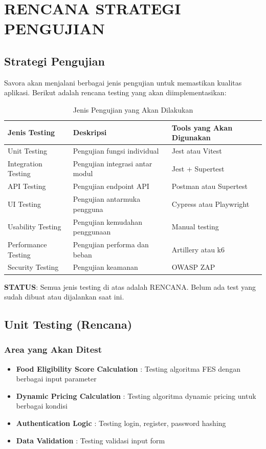 \section{RENCANA STRATEGI PENGUJIAN}

\subsection{Strategi Pengujian}

Savora akan menjalani berbagai jenis pengujian untuk memastikan kualitas aplikasi. Berikut adalah rencana testing yang akan diimplementasikan:

\begin{table}[H]
\centering
\caption{Jenis Pengujian yang Akan Dilakukan}
\label{tab:testing}
\begin{tabularx}{\textwidth}{|l|X|X|}
\hline
\textbf{Jenis Testing} & \textbf{Deskripsi} & \textbf{Tools yang Akan Digunakan} \\
\hline
Unit Testing & Pengujian fungsi individual & Jest atau Vitest \\
\hline
Integration Testing & Pengujian integrasi antar modul & Jest + Supertest \\
\hline
API Testing & Pengujian endpoint API & Postman atau Supertest \\
\hline
UI Testing & Pengujian antarmuka pengguna & Cypress atau Playwright \\
\hline
Usability Testing & Pengujian kemudahan penggunaan & Manual testing \\
\hline
Performance Testing & Pengujian performa dan beban & Artillery atau k6 \\
\hline
Security Testing & Pengujian keamanan & OWASP ZAP \\
\hline
\end{tabularx}
\end{table}

\textbf{STATUS}: Semua jenis testing di atas adalah RENCANA. Belum ada test yang sudah dibuat atau dijalankan saat ini.

\subsection{Unit Testing (Rencana)}

\subsubsection{Area yang Akan Ditest}
\begin{itemize}[leftmargin=*]
    \item \textbf{Food Eligibility Score Calculation} : Testing algoritma FES dengan berbagai input parameter
    \item \textbf{Dynamic Pricing Calculation} : Testing algoritma dynamic pricing untuk berbagai kondisi
    \item \textbf{Authentication Logic} : Testing login, register, password hashing
    \item \textbf{Data Validation} : Testing validasi input form
\end{itemize}

